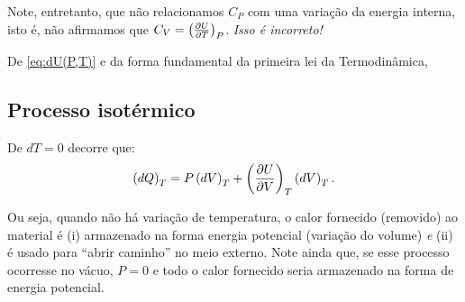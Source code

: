 \documentclass[a4paper,12pt]{scrartcl}
\begin{document}
  Note, entretanto, que não relacionamos $C_P$ com uma variação da energia interna, isto é, não afirmamos que $C_V = \left(\frac{\partial U}{\partial T}\right)_{P}$. \emph{Isso é incorreto!}
  
  De \eqref{eq:dU(P,T)} e da forma fundamental da primeira lei da Termodinâmica, 

  
  
  
  
  
  
  \subsection*{Processo isotérmico}
  
  De $dT = 0$ decorre que:
  \begin{equation*}
  \left(dQ\right)_T = P\left(dV\right)_T + \left(\frac{\partial U}{\partial V}\right)_{T}\left(dV\right)_T.
  \end{equation*}
  
  Ou seja, quando não há variação de temperatura, o calor fornecido (removido) ao material é (i) armazenado na forma energia potencial (variação do volume) \emph{e} (ii) é usado para ``abrir caminho'' no meio externo. Note ainda que, se esse processo ocorresse no vácuo, $P = 0$ e todo o calor fornecido seria armazenado na forma de energia potencial.
  

  

  
  
  
\end{document}
